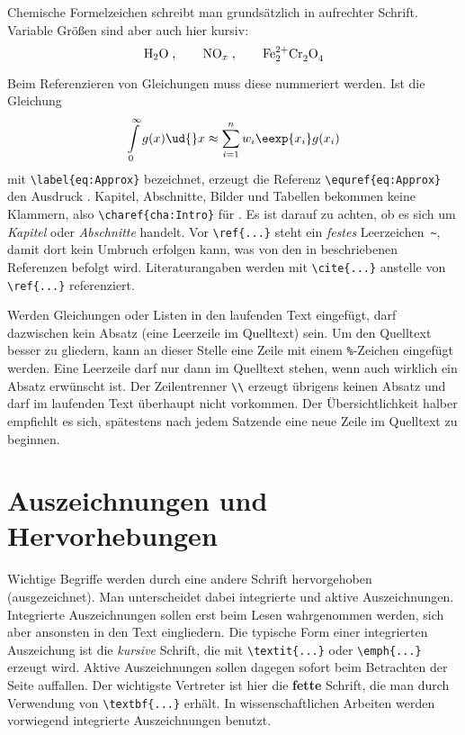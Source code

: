 Chemische Formelzeichen schreibt man grundsätzlich in aufrechter Schrift.
Variable Größen sind aber auch hier kursiv:
\begin{equation*}
	\mathrm{H_2 O}\;,\qquad
	\mathrm{NO}_x\;,\qquad
	\mathrm{Fe_2^{2+}Cr_2^{\vphantom{2+}}O_4^{\vphantom{2+}}}
\end{equation*}


Beim Referenzieren von Gleichungen muss diese nummeriert werden.
Ist die Gleichung
\begin{equation}
	\label{eq:Approx}
	\int\limits_0^\infty g(x)\ud{}x \approx \sum_{i=1}^n w_i\eexp{x_i} g(x_i)
\end{equation}
mit \verb|\label{eq:Approx}| bezeichnet, erzeugt die Referenz \verb|\equref{eq:Approx}| den Ausdruck \glqq {}\grqq.
Kapitel, Abschnitte, Bilder und Tabellen bekommen keine Klammern, also \zB \verb|\charef{cha:Intro}| für \glqq {}\grqq.
Es ist darauf zu achten, ob es sich um \emph{Kapitel} oder \emph{Abschnitte} handelt.
Vor \verb|\ref{...}| steht ein \emph{festes} Leerzeichen~\verb|~|, damit dort kein Umbruch erfolgen kann, was von den in  beschriebenen Referenzen befolgt wird.
Literaturangaben werden mit \verb|\cite{...}| anstelle von \verb|\ref{...}| referenziert.

Werden Gleichungen oder Listen in den laufenden Text eingefügt, darf dazwischen kein Absatz (\dah eine Leerzeile im Quelltext) sein.
Um den Quelltext besser zu gliedern, kann an dieser Stelle eine Zeile mit einem \verb|%|-Zeichen eingefügt werden.
Eine Leerzeile darf nur dann im Quelltext stehen, wenn auch wirklich ein Absatz erwünscht ist.
Der Zeilentrenner \verb|\\| erzeugt übrigens keinen Absatz und darf im laufenden Text überhaupt nicht vorkommen.
Der Übersichtlichkeit halber empfiehlt es sich, spätestens nach jedem Satzende eine neue Zeile im Quelltext zu beginnen.


\section{Auszeichnungen und Hervorhebungen}
Wichtige Begriffe werden durch eine andere Schrift hervorgehoben (ausgezeichnet).
Man unterscheidet dabei integrierte und aktive Auszeichnungen.
Integrierte Auszeichnungen sollen erst beim Lesen wahrgenommen werden, sich aber ansonsten in den Text eingliedern.
Die typische Form einer integrierten Auszeichung ist die \emph{kursive} Schrift, die mit \verb|\textit{...}| oder \verb|\emph{...}| erzeugt wird.
Aktive Auszeichnungen sollen dagegen sofort beim Betrachten der Seite auffallen.
Der wichtigste Vertreter ist hier die \textbf{fette} Schrift, die man durch Verwendung von \verb|\textbf{...}| erhält.
In wissenschaftlichen Arbeiten werden vorwiegend integrierte Auszeichnungen benutzt.

